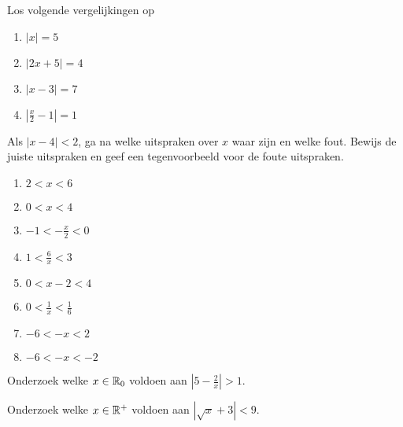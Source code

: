 \documentclass{ximera}
\author{Wim Obbels}
\begin{document}
\begin{exercise}

Los volgende vergelijkingen op

\begin{multicols}{2}
\begin{enumerate}
		\item $|x|=5$
		\item $|2x+5|=4$
		\item $|x-3|=7$ 
		\item $\displaystyle\left|\frac{x}{2}-1\right|=1$
\end{enumerate}
\end{multicols}

\end{exercise}

\begin{exercise}
\item \label{oef8}Als $|x-4|<2$, ga na welke uitspraken over $x$
waar zijn en welke fout. Bewijs de juiste uitspraken en geef een
tegenvoorbeeld voor de foute
uitspraken. \\
\begin{enumerate}
			\item $2<x<6$
			\item $0<x<4$
			\item $\displaystyle  -1<-\frac{x}{2}<0$
			\item $\displaystyle  1<\frac{6}{x}<3$
			\item $0<x-2<4$
			\item $\displaystyle  0<\frac{1}{x}<\frac{1}{6}$
			\item $-6<-x<2$
			\item $-6<-x<-2$
\end{enumerate}
\end{exercise}

\begin{exercise} 
	Onderzoek welke $x\in \mathbb{R}_0$ voldoen aan $\displaystyle \left|5-\frac{2}{x}\right|>1$.
\end{exercise}
\begin{exercise} 
	Onderzoek welke $x\in \mathbb{R}^+$ voldoen aan $|\sqrt{x}+3|<9$.
\end{exercise}
\end{document}
